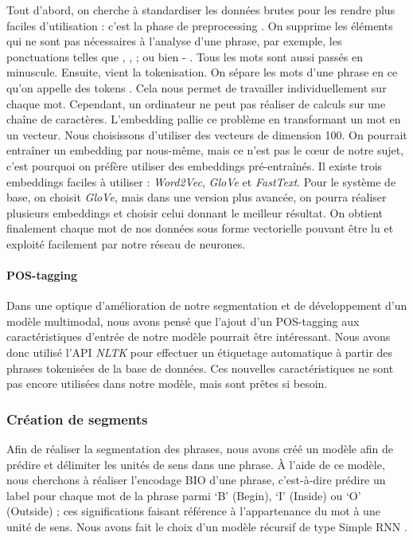 \documentclass[a4paper, twoside, 11pt]{article}
\begin{document}
Tout d’abord, on cherche à standardiser les données brutes pour les rendre plus faciles d'utilisation : c’est la phase de \og preprocessing \fg{}. On supprime les éléments qui ne sont pas nécessaires à l’analyse d’une phrase, par exemple, les ponctuations telles que \og , \fg{}, \og ; \fg{} ou bien \og - \fg{}. Tous les mots sont aussi passés en minuscule. Ensuite, vient la tokenisation. On sépare les mots d’une phrase en ce qu'on appelle des \og tokens \fg{}. Cela nous permet de travailler individuellement sur chaque mot.
Cependant, un ordinateur ne peut pas réaliser de calculs sur une chaîne de caractères. L’embedding pallie ce problème en transformant un mot en un vecteur. Nous choisissons d’utiliser des vecteurs de dimension 100. On pourrait entraîner un embedding par nous-même, mais ce n’est pas le cœur de notre sujet, c'est pourquoi on préfère utiliser des embeddings pré-entraînés. Il existe trois embeddings faciles à utiliser : \textit{Word2Vec}, \textit{GloVe} et \textit{FastText}. Pour le système de base, on choisit \textit{GloVe}, mais dans une version plus avancée, on pourra réaliser plusieurs embeddings et choisir celui donnant le meilleur résultat. On obtient finalement chaque mot de nos données sous forme vectorielle pouvant être lu et exploité facilement par notre réseau de neurones.

 \paragraph{POS-tagging}

Dans une optique d’amélioration de notre segmentation et de développement d'un modèle multimodal, nous avons pensé que l’ajout d’un \og POS-tagging \fg{} aux caractéristiques d’entrée de notre modèle pourrait être intéressant. Nous avons donc utilisé l’API \textit{NLTK} pour effectuer un étiquetage automatique à partir des phrases tokenisées de la base de données. Ces nouvelles caractéristiques ne sont pas encore utilisées dans notre modèle, mais sont prêtes si besoin.

    \subsubsection{Création de segments}
 Afin de réaliser la segmentation des phrases, nous avons créé un modèle afin de prédire et délimiter les unités de sens dans une phrase. À l’aide de ce modèle, nous cherchons à réaliser l'encodage BIO d’une phrase, c’est-à-dire prédire un label pour chaque mot de la phrase parmi ‘B’ (Begin), ‘I’ (Inside) ou ‘O’ (Outside) ; ces significations faisant référence à l’appartenance du mot à une unité de sens. Nous avons fait le choix d’un modèle récursif de type \og Simple RNN \fg{}.
\end{document}
